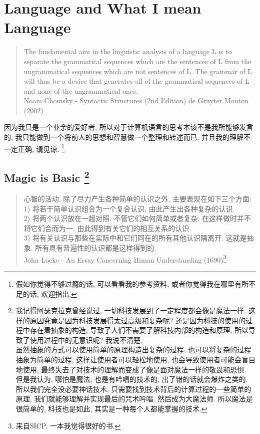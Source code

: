 \chapter{Language and What I mean Language}

\begin{quotation}
  The fundamental aim in the linguistic analysis of a language L is to separate the grammatical sequences which are the sentences of L from the ungrammatical sequences which are not sentences of L. 
  The grammar of L will thus be a device that generates all of the grammatical sequences of L and none of the ungrammatical ones. \\

  Noam Chomsky - Syntactic Structures (2nd Edition) de Gruyter Mouton (2002)
\end{quotation}

因为我只是一个业余的爱好者, 所以对于计算机语言的思考本该不是我所能够发言的, 我只能做到一个将前人的思想和智慧做一个整理和转述而已. 并且我的理解不一定正确, 请见谅. \footnote{假如你觉得不够过瘾的话, 可以看看我的参考资料, 或者你觉得我在哪里有所不足的话, 欢迎指出. }

\section{Magic is Basic \footnote{我记得阿瑟克拉克曾经说过, 一切科技发展到了一定程度都会像是魔法一样. 这样的原因究竟是因为科技发展得太过高级和复杂呢? 还是因为科技的使用的过程中存在着抽象的构造, 导致了人们不需要了解科技内部的构造和原理, 所以导致了使用过程中的无意识呢? 我说不清楚. \\ 虽然抽象的方式可以使用简单的原理构造出复杂的过程, 也可以将复杂的过程抽象为简单的过程, 这样让使用者可以轻松地使用, 也会导致使用者可能会盲目地使用, 最终失去了对技术的理解而变成了像是面对魔法一样的敬畏和恐惧. \\ 但是我认为, 哪怕是魔法, 也是有吟唱的技术的, 出了错的话就会爆炸之类的. 所以我们完全没必要神话技术, 只需要找到技术背后的计算过程的一些简单的原理, 我们就能够理解并实现最后的咒术吟唱. 然后成为大魔法师. 所以魔法是很简单的, 科技也是如此, 其实是一种每个人都能掌握的技术. }}
\begin{quotation}
  心智的活动, 除了尽力产生各种简单的认识之外, 主要表现在如下三个方面: \\
  1) 将若干简单认识组合为一个复合认识, 由此产生出各种复杂的认识. \\
  2) 将两个认识放在一超对照. 不管它们如何简单或者复杂. 在这样做时并不将它们合而为一. 由此得到有关它们的相互关系的认识. \\
  3) 将有关认识与那些在实际中和它们同在的所有其他认识隔离开. 这就是抽象. 所有具有普遍性的认识都是这样得到的. \\

  John Locke - An Essay Concerning Himan Understanding (1690)\footnote{来自SICP. 一本我觉得很好的书. }
\end{quotation}

